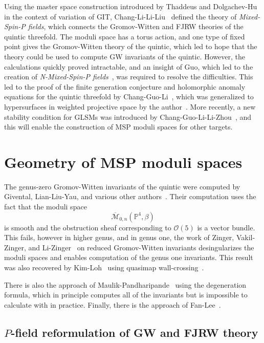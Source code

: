 \documentclass[10pt,oldfontcommands,oneside]{memoir}
\theoremstyle{definition}
\theoremstyle{remark}
\theoremstyle{plain}
\theoremstyle{definition}
\theoremstyle{remark}
\renewcommand{\P}{\mathbb{P}}
\newcommand{\Mbar}{\overline{\mathcal{M}}}
\newcommand{\mc}[1]{\mathcal{#1}}
\newcommand{\1}{\mathbf{1}}
\newcommand{\2}{\mathbf{2}}
\newcommand{\3}{\mathbf{3}}
\begin{document}
Using the master space construction introduced by Thaddeus and Dolgachev-Hu~\cite{gitflips,dhgit} in the context of variation of GIT, Chang-Li-Li-Liu~\cite{mspfermat,msp2} defined the theory of \textit{Mixed-Spin-P fields}, which connects the Gromov-Witten and FJRW theories of the quintic threefold. The moduli space has a torus action, and one type of fixed point gives the Gromov-Witten theory of the quintic, which led to hope that the theory could be used to compute GW invariants of the quintic. However, the calculations quickly proved intractable, and an insight of Guo, which led to the creation of \textit{N-Mixed-Spin-P fields}~\cite{nmsp}, was required to resolve the difficulties. This led to the proof of the finite generation conjecture and holomorphic anomaly equations for the quintic threefold by Chang-Guo-Li~\cite{nmsp2,nmsp3}, which was generalized to hypersurfaces in weighted projective space by the author~\cite{polynomiality,bcovme}. More recently, a new stability condition for GLSMs was introduced by Chang-Guo-Li-Li-Zhou~\cite{generalmsp}, and this will enable the construction of MSP moduli spaces for other targets.

\section{Geometry of MSP moduli spaces}%
\label{sec:Prehistory}

The genus-zero Gromov-Witten invariants of the quintic were computed by Givental, Lian-Liu-Yau, and various other authors~\cite{eqgwinv,lly}. Their computation uses the fact that the moduli space
\[ \Mbar_{0,n}(\P^4, \beta) \]
is smooth and the obstruction sheaf corresponding to $\mc{O}(5)$ is a vector bundle. This fails, however in higher genus, and in genus one, the work of Zinger, Vakil-Zinger, and Li-Zinger~\cite{reducedgenus1,desingularizationgenusone,g1cilizinger} on reduced Gromov-Witten invariants desingularizes the moduli spaces and enables computation of the genus one invariants. This result was also recovered by Kim-Loh~\cite{kimlho} using quasimap wall-crossing~\cite{qmapwcms,qmapwc}.

There is also the approach of Maulik-Pandharipande~\cite{topviewofgw} using the degeneration formula, which in principle computes all of the invariants but is impossible to calculate with in practice. Finally, there is the approach of Fan-Lee~\cite{fanlee}.

\subsection{$P$-field reformulation of GW and FJRW theory}
\label{sub:P fields}
\end{document}

